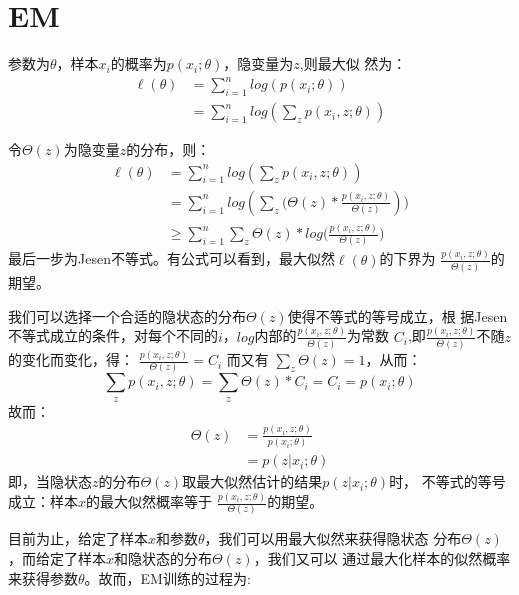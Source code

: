 
\section{EM}


参数为$\theta$，样本$x_i$的概率为$p(x_i;\theta)$，隐变量为$z$,则最大似
然为：
\begin{displaymath}
\begin{split}
\ell(\theta) &= \sum_{i=1}^{n}{log(p(x_i;\theta))}\\
&= \sum_{i=1}^{n}{log(\sum_{z}{p(x_i,z;\theta)})}
\end{split}
\end{displaymath} 

令$\Theta(z)$为隐变量$z$的分布，则：
\begin{displaymath}
\begin{split}
\ell(\theta) &= \sum_{i=1}^{n}{log(\sum_{z}{p(x_i,z;\theta)})}\\
&=
\sum_{i=1}^{n}{log(\sum_{z}{(\Theta(z)*\frac{p(x_i,z;\theta)}{\Theta(z)}}))}\\
&\geq \sum_{i=1}^{n}{\sum_{z}{\Theta(z)*log(\frac{p(x_i,z;\theta)}{\Theta(z)}})}
\end{split}
\end{displaymath} 
最后一步为Jesen不等式。有公式可以看到，最大似然$\ell(\theta)$的下界为
$\frac{p(x_i,z;\theta)}{\Theta(z)}$的期望。

我们可以选择一个合适的隐状态的分布$\Theta(z)$使得不等式的等号成立，根
据Jesen不等式成立的条件，对每个不同的$i$，$log$内部的$\frac{p(x_i,z;\theta)}{\Theta(z)}$为常数
$C_i$,即$\frac{p(x_i,z;\theta)}{\Theta(z)}$不随$z$的变化而变化，得：
$\frac{p(x_i,z;\theta)}{\Theta(z)} = C_i$
而又有 $\sum_{z}{\Theta(z)}=1$，从而：
\begin{displaymath}
\sum_{z}{p(x_i,z;\theta)} = \sum_{z}{\Theta(z)*C_i}
=C_i
=p(x_i;\theta)
\end{displaymath} 
故而：
\begin{displaymath}
\begin{split}
\Theta(z) &= \frac{p(x_i,z;\theta)}{p(x_i;\theta)}\\
&=p(z|x_i;\theta)
\end{split}
\end{displaymath} 
即，当隐状态$z$的分布$\Theta(z)$取最大似然估计的结果$p(z|x_i;\theta)$时，
不等式的等号成立：样本$x$的最大似然概率等于
$\frac{p(x_i,z;\theta)}{\Theta(z)}$的期望。

目前为止，给定了样本$x$和参数$\theta$，我们可以用最大似然来获得隐状态
分布$\Theta(z)$，而给定了样本$x$和隐状态的分布$\Theta(z)$，我们又可以
通过最大化样本的似然概率来获得参数$\theta$。故而，EM训练的过程为:

